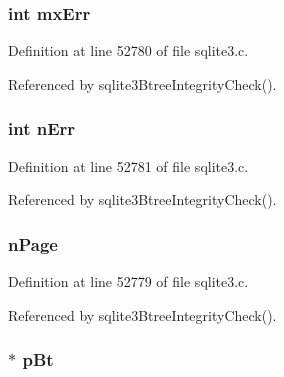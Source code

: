 \hypertarget{struct_integrity_ck_a3e55f72c462ad39e133ce8ec76df17a9}{}
\subsubsection[{mx\+Err}]{\setlength{\rightskip}{0pt plus 5cm}int mx\+Err}\label{struct_integrity_ck_a3e55f72c462ad39e133ce8ec76df17a9}


Definition at line 52780 of file sqlite3.\+c.



Referenced by sqlite3\+Btree\+Integrity\+Check().

\hypertarget{struct_integrity_ck_a60ebed73c4dbe105fdc4be21a01fd09c}{}
\subsubsection[{n\+Err}]{\setlength{\rightskip}{0pt plus 5cm}int n\+Err}\label{struct_integrity_ck_a60ebed73c4dbe105fdc4be21a01fd09c}


Definition at line 52781 of file sqlite3.\+c.



Referenced by sqlite3\+Btree\+Integrity\+Check().

\hypertarget{struct_integrity_ck_a7c5c75401b248c3b69ec443ede680c30}{}
\subsubsection[{n\+Page}]{ n\+Page}\label{struct_integrity_ck_a7c5c75401b248c3b69ec443ede680c30}


Definition at line 52779 of file sqlite3.\+c.



Referenced by sqlite3\+Btree\+Integrity\+Check().

\hypertarget{struct_integrity_ck_a2bc66d19c064bb25ff335241f8c621df}{}
\subsubsection[{p\+Bt}]{$\ast$ p\+Bt}\label{struct_integrity_ck_a2bc66d19c064bb25ff335241f8c621df}


